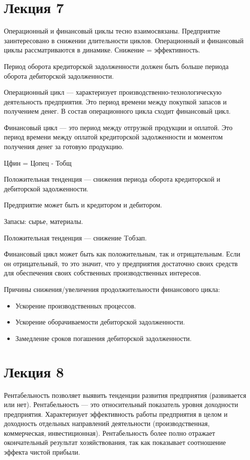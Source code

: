 \documentclass[14pt]{extarticle}
\begin{document}
\section*{Лекция 7}
Операционный и финансовый циклы тесно взаимосвязаны. Предприятие заинтересовано в снижении длительности циклов. Операционный и финансовый циклы рассматриваются в динамике. Снижение = эффективность.

Период оборота кредиторской задолженности должен быть больше периода оборота дебиторской задолженности. 

Операционный цикл — характеризует производственно-технологическую деятельность предприятия. Это период времени между покупкой запасов и получением денег. В состав операционного цикла сходит финансовый цикл. 

Финансовый цикл — это период между отгрузкой продукции и оплатой. Это период времени между оплатой кредиторской задолженности и моментом получения денег за готовую продукцию.

Ц{фин} = Ц{опец} - Т{общ}

Положительная тенденция — снижения периода оборота кредиторской и дебиторской задолженности. 

Предприятие может быть и кредитором и дебитором. 

Запасы: сырье, материалы.

Положительная тенденция — снижение T{обзап}. 

Финансовый цикл может быть как положительным, так и отрицательным. Если он отрицательный, то это значит, что у предприятия достаточно своих средств для обеспечения своих собственных производственных интересов. 

Причины снижения/увеличения продолжительности финансового цикла:
\begin{itemize}
  \item Ускорение производственных процессов.
  \item Ускорение оборачиваемости дебиторской задолженности.
  \item Замедление сроков погашения дебиторской задолженности.
\end{itemize}

\section*{Лекция 8}
Рентабельность позволяет выявить тенденции развития предприятия (развивается или нет). Рентабельность — это относительный показатель уровня доходности предприятия. Характеризует эффективность работы предприятия в целом и доходность отдельных направлений деятельности (производственная, коммерческая, инвестиционная). Рентабельность более полно отражает окончательный результат хозяйствования, так как показывает соотношение эффекта чистой прибыли.
\end{document}
